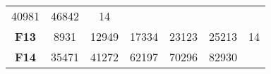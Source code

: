 \documentclass[12pt,a4paper]{article}
\begin{document}
\begin{longtable}[c]{@{}ccccccc@{}}
\begin{minipage}[t]{0.10\columnwidth}\centering\strut
40981
\strut\end{minipage} &
\begin{minipage}[t]{0.11\columnwidth}\centering\strut
46842
\strut\end{minipage} &
\begin{minipage}[t]{0.07\columnwidth}\centering\strut
14
\strut\end{minipage}\tabularnewline
\begin{minipage}[t]{0.11\columnwidth}\centering\strut
\textbf{F13}
\strut\end{minipage} &
\begin{minipage}[t]{0.08\columnwidth}\centering\strut
8931
\strut\end{minipage} &
\begin{minipage}[t]{0.08\columnwidth}\centering\strut
12949
\strut\end{minipage} &
\begin{minipage}[t]{0.09\columnwidth}\centering\strut
17334
\strut\end{minipage} &
\begin{minipage}[t]{0.10\columnwidth}\centering\strut
23123
\strut\end{minipage} &
\begin{minipage}[t]{0.11\columnwidth}\centering\strut
25213
\strut\end{minipage} &
\begin{minipage}[t]{0.07\columnwidth}\centering\strut
14
\strut\end{minipage}\tabularnewline
\begin{minipage}[t]{0.11\columnwidth}\centering\strut
\textbf{F14}
\strut\end{minipage} &
\begin{minipage}[t]{0.08\columnwidth}\centering\strut
35471
\strut\end{minipage} &
\begin{minipage}[t]{0.08\columnwidth}\centering\strut
41272
\strut\end{minipage} &
\begin{minipage}[t]{0.09\columnwidth}\centering\strut
62197
\strut\end{minipage} &
\begin{minipage}[t]{0.10\columnwidth}\centering\strut
70296
\strut\end{minipage} &
\begin{minipage}[t]{0.11\columnwidth}\centering\strut
82930
\strut\end{minipage} &

\end{longtable}
\end{document}
